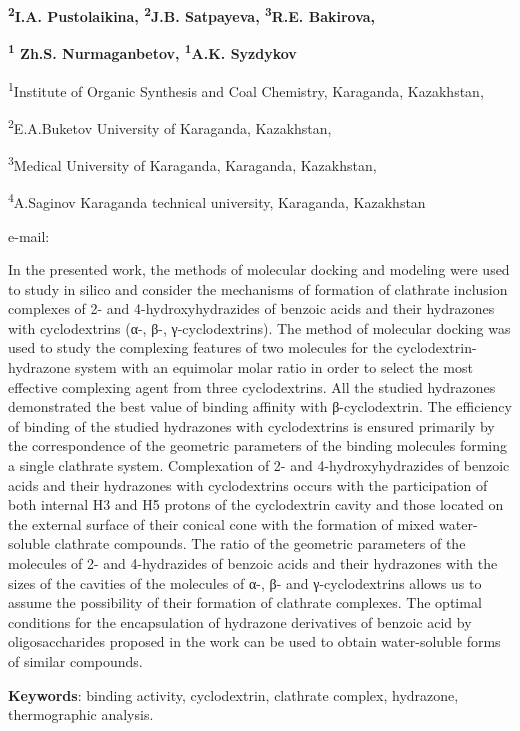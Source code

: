 {\bfseries \textsuperscript{2}I.A. Pustolaikina, \textsuperscript{2}J.B.
Satpayeva, \textsuperscript{3}R.E. Bakirova,}

{\bfseries \textsuperscript{1} Zh.S. Nurmaganbetov, \textsuperscript{1}A.K.
Syzdykov}

\textsuperscript{1}Institute of Organic Synthesis and Coal Chemistry,
Karaganda, Kazakhstan,

\textsuperscript{2}E.A.Buketov University of Karaganda, Kazakhstan,

\textsuperscript{3}Medical University of Karaganda, Karaganda,
Kazakhstan,

\textsuperscript{4}A.Saginov Karaganda technical university, Karaganda,
Kazakhstan

e-mail: \href{mailto:iosu8990@mail.ru}{}

In the presented work, the methods of molecular docking and modeling
were used to study in silico and consider the mechanisms of formation of
clathrate inclusion complexes of 2- and 4-hydroxyhydrazides of benzoic
acids and their hydrazones with cyclodextrins (α-, β-, γ-cyclodextrins).
The method of molecular docking was used to study the complexing
features of two molecules for the cyclodextrin-hydrazone system with an
equimolar molar ratio in order to select the most effective complexing
agent from three cyclodextrins. All the studied hydrazones demonstrated
the best value of binding affinity with β-cyclodextrin. The efficiency
of binding of the studied hydrazones with cyclodextrins is ensured
primarily by the correspondence of the geometric parameters of the
binding molecules forming a single clathrate system. Complexation of 2-
and 4-hydroxyhydrazides of benzoic acids and their hydrazones with
cyclodextrins occurs with the participation of both internal H3 and H5
protons of the cyclodextrin cavity and those located on the external
surface of their conical cone with the formation of mixed water-soluble
clathrate compounds. The ratio of the geometric parameters of the
molecules of 2- and 4-hydrazides of benzoic acids and their hydrazones
with the sizes of the cavities of the molecules of α-, β- and
γ-cyclodextrins allows us to assume the possibility of their formation
of clathrate complexes. The optimal conditions for the encapsulation of
hydrazone derivatives of benzoic acid by oligosaccharides proposed in
the work can be used to obtain water-soluble forms of similar compounds.

{\bfseries Keywords}: binding activity, cyclodextrin, clathrate complex,
hydrazone, thermographic analysis.

